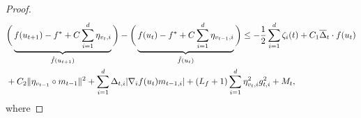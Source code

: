 \documentclass{article} %
\begin{document}
\begin{proof}
\begin{align*}
&\bigg(\underbrace{{f(u_{t+1})-f^*+C\sum_{i=1}^{d}\eta_{v_{t},i}}}_{\hat{f}(u_{t+1})}\bigg)-\bigg(\underbrace{{f(u_{t})-f^*+C\sum_{i=1}^{d}\eta_{v_{t-1},i}}}_{\hat{f}(u_{t})}\bigg)\le-\frac{1}{2}\sum_{i=1}^{d}\zeta_{i}(t)+C_{1}\overline{\Delta}_{t}\cdot f(u_{t})\notag\\&+C_{2}\|{\eta_{v_{t-1}}}\circ m_{t-1}\|^{2}+\sum_{i=1}^{d}\Delta_{t,i}|\nabla_{i} f(u_{t})m_{t-1,i}|+(L_{f}+1)\sum_{i=1}^{d}\eta_{v_{t},i}^{2}g_{t,i}^{2}+M_{t},
\end{align*}
where

\end{proof}
\end{document}

